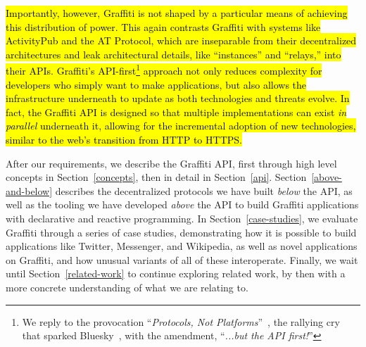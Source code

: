 \hl{%
Importantly, however, Graffiti is not shaped by a particular
means of achieving this distribution of power. This again contrasts Graffiti
with systems like ActivityPub and the AT Protocol,
which are inseparable from their decentralized architectures
and leak architectural details, like ``instances'' and ``relays,''
into their APIs.
Graffiti's API-first\footnote{
We reply to the provocation ``\emph{Protocols, Not Platforms}''~{\cite{protocolsnotplatforms}},
the rallying cry that sparked Bluesky~{\cite{bluesky_from_protocols}},
with the amendment, ``\emph{...but the API first!}''
} approach not only reduces complexity for
developers who simply want to make applications,
but also allows the infrastructure underneath
to update as both technologies and threats evolve.
In fact, the Graffiti API is designed so that multiple implementations can exist
\emph{in parallel} underneath it,
allowing for the incremental adoption of new technologies,
similar to the web's transition from HTTP to HTTPS.
}%

After our requirements, we describe the Graffiti API,
first through high level concepts in Section~\ref{concepts},
then in detail in Section~\ref{api}.
Section~\ref{above-and-below} describes
the decentralized protocols we have built \emph{below} the API,
as well as the tooling we have developed \emph{above} the API
to build Graffiti applications with declarative and reactive programming.
In Section~\ref{case-studies},
we evaluate Graffiti through a series of case studies, demonstrating
how it is possible to build applications like Twitter, Messenger, and
Wikipedia, as well as novel applications on Graffiti, and how unusual
variants of all of these interoperate.
Finally, we wait until Section~\ref{related-work}
to continue exploring related work, by then with a more concrete
understanding of what we are relating to.
